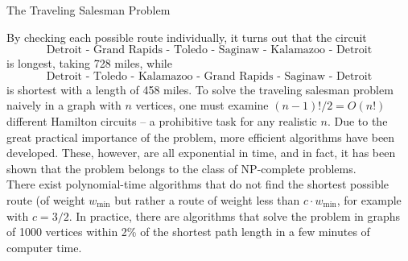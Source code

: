 \documentclass[smaller,hyperref={CJKbookmarks=true}]{beamer}
\begin{document}
\begin{frame}{The Traveling Salesman Problem}
\begin{spacing}{1.1}
By checking each possible route individually, it turns out that the circuit
\[\text{Detroit - Grand Rapids - Toledo - Saginaw - Kalamazoo - Detroit}\]
is longest, taking 728 miles, while
\[\text{Detroit - Toledo - Kalamazoo - Grand Rapids - Saginaw - Detroit}\]
is shortest with a length of 458 miles.
\newpage
\vspace*{9pt}
To solve the traveling salesman problem naively in a graph with $n$ vertices,
one must examine $(n-1)!/2=O(n!)$ different Hamilton circuits – a
prohibitive task for any realistic $n$. Due to the great practical importance
of the problem, more efficient algorithms have been developed. These,
however, are all exponential in time, and in fact, it has been shown that
the problem belongs to the class of NP-complete problems.\\[6pt]
There exist polynomial-time algorithms that do not find the shortest
possible route (of weight $w_{\min}$ but rather a route of weight less than $c\cdot w_{\min}$, for example with $c=3/2$. In practice, there are algorithms that solve the problem in graphs of 1000 vertices within 2\% of the shortest path length in a few minutes of computer time.
\end{spacing}
\end{frame}
\end{document}
